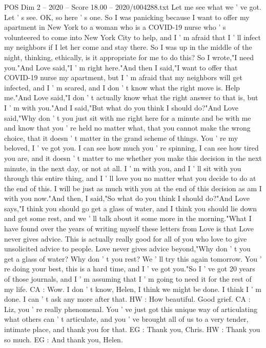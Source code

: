 \begin{textsample}{POS Dim 2 – 2020 – Score 18.00 – 2020/t004288.txt}
Let me see what we ' ve got.
Let ' s see.
OK, so here ' s one.
So I was panicking because I want to offer my apartment in New York to a woman who is a COVID-19 nurse who ' s volunteered to come into New York City to help, and I ' m afraid that I ' ll infect my neighbors if I let her come and stay there.
So I was up in the middle of the night, thinking, ethically, is it appropriate for me to do this?
So I wrote,"I need you."And Love said,"I ' m right here."And then I said,"I want to offer that COVID-19 nurse my apartment, but I ' m afraid that my neighbors will get infected, and I ' m scared, and I don ' t know what the right move is.
Help me."And Love said,"I don ' t actually know what the right answer to that is, but I ' m with you."And I said,"But what do you think I should do?"And Love said,"Why don ' t you just sit with me right here for a minute and be with me and know that you ' re held no matter what, that you cannot make the wrong choice, that it doesn ' t matter in the grand scheme of things.
You ' re my beloved, I ' ve got you.
I can see how much you ' re spinning, I can see how tired you are, and it doesn ' t matter to me whether you make this decision in the next minute, in the next day, or not at all.
I ' m with you, and I ' ll sit with you through this entire thing, and I ' ll love you no matter what you decide to do at the end of this.
I will be just as much with you at the end of this decision as am I with you now."And then, I said,"So what do you think I should do?"And Love says,"I think you should go get a glass of water, and I think you should lie down and get some rest, and we ' ll talk about it some more in the morning."What I have found over the years of writing myself these letters from Love is that Love never gives advice.
This is actually really good for all of you who love to give unsolicited advice to people.
Love never gives advice beyond,"Why don ' t you get a glass of water?
Why don ' t you rest?
We ' ll try this again tomorrow.
You ' re doing your best, this is a hard time, and I ' ve got you."So I ' ve got 20 years of those journals, and I ' m assuming that I ' m going to need it for the rest of my life.
CA : Wow.
I don ' t know, Helen, I think we might be done.
I think I ' m done.
I can ' t ask any more after that.
HW : How beautiful.
Good grief.
CA : Liz, you ' re really phenomenal.
You ' ve just got this unique way of articulating what others can ' t articulate, and you ' ve brought all of us to a very tender, intimate place, and thank you for that.
EG : Thank you, Chris.
HW : Thank you so much.
EG : And thank you, Helen.

\end{textsample}
